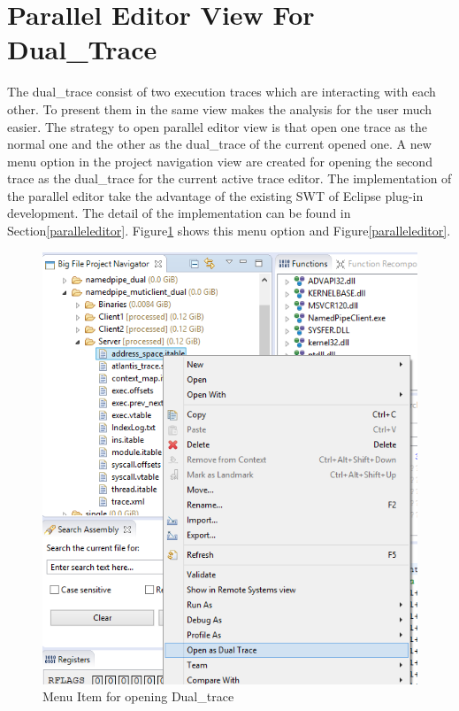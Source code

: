 \section{Parallel Editor View For Dual\_Trace}
The dual\_trace consist of two execution traces which are interacting with each other. To present them in the same view makes the analysis for the user much easier. The strategy to open parallel editor view is that open one trace as the normal one and the other as the dual\_trace of the current opened one. A new menu option in the project navigation view are created for opening the second trace as the dual\_trace for the current active trace editor. The implementation of the parallel editor take the advantage of the existing SWT of Eclipse plug-in development. The detail of the implementation can be found in Section\ref{paralleleditor}. Figure\ref{opendualtracemenu} shows this menu option and Figure\ref{paralleleditor}.

\begin{figure}[H]
\centerline{\includegraphics[scale=0.5]{Figures/opendualtracemenu}}
 \caption{Menu Item for opening Dual\_trace}
\label{opendualtracemenu}
\end{figure}

